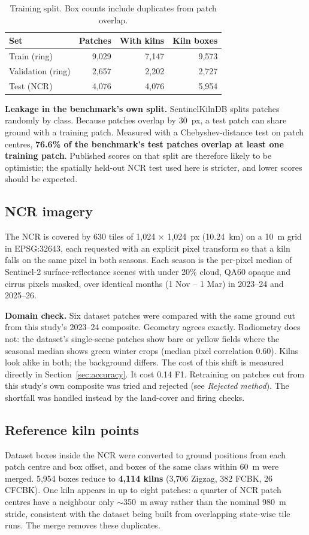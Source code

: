 \documentclass[11pt,a4paper]{article}
\begin{document}
\begin{table}[H]
\centering\small
\begin{tabular}{@{}lrrr@{}}
\toprule
Set & Patches & With kilns & Kiln boxes \\
\midrule
Train (ring)      & 9{,}029 & 7{,}147 & 9{,}573 \\
Validation (ring) & 2{,}657 & 2{,}202 & 2{,}727 \\
Test (NCR)        & 4{,}076 & 4{,}076 & 5{,}954 \\
\bottomrule
\end{tabular}
\caption{Training split. Box counts include duplicates from patch overlap.}
\end{table}

\textbf{Leakage in the benchmark's own split.} SentinelKilnDB splits patches
randomly by class. Because patches overlap by 30~px, a test patch can share
ground with a training patch. Measured with a Chebyshev-distance test on patch
centres, \textbf{76.6\% of the benchmark's test patches overlap at least one
training patch}. Published scores on that split are therefore likely to be
optimistic; the spatially held-out NCR test used here is stricter, and lower
scores should be expected.

\subsection{NCR imagery}
The NCR is covered by 630 tiles of 1{,}024 $\times$ 1{,}024~px (10.24~km) on a
10~m grid in EPSG:32643, each requested with an explicit pixel transform so
that a kiln falls on the same pixel in both seasons. Each season is the
per-pixel median of Sentinel-2 surface-reflectance scenes with under 20\% cloud,
QA60 opaque and cirrus pixels masked, over identical months
(1 Nov -- 1 Mar) in 2023--24 and 2025--26.

\textbf{Domain check.} Six dataset patches were compared with the same ground cut
from this study's 2023--24 composite. Geometry agrees exactly. Radiometry does
not: the dataset's single-scene patches show bare or yellow fields where the
seasonal median shows green winter crops (median pixel correlation 0.60).
Kilns look alike in both; the background differs. The cost of this shift is
measured directly in Section~\ref{sec:accuracy}. It cost 0.14 F1. Retraining on
patches cut from this study's own composite was tried and rejected (see
\emph{Rejected method}). The shortfall was handled instead by the land-cover
and firing checks.

\subsection{Reference kiln points}
Dataset boxes inside the NCR were converted to ground positions from each patch
centre and box offset, and boxes of the same class within 60~m were merged.
5{,}954 boxes reduce to \textbf{4{,}114 kilns} (3{,}706 Zigzag, 382 FCBK,
26 CFCBK). One kiln appears in up to eight patches: a quarter of NCR patch
centres have a neighbour only $\sim$350~m away rather than the nominal 980~m
stride, consistent with the dataset being built from overlapping state-wise
tile runs. The merge removes these duplicates.
\end{document}
